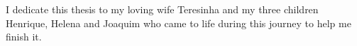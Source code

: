 

\chapter*{}

\vfill

\begin{center}
I dedicate this thesis to my loving wife Teresinha and my three children Henrique, Helena and Joaquim who came to life during this journey to help me finish it.
\end{center}


